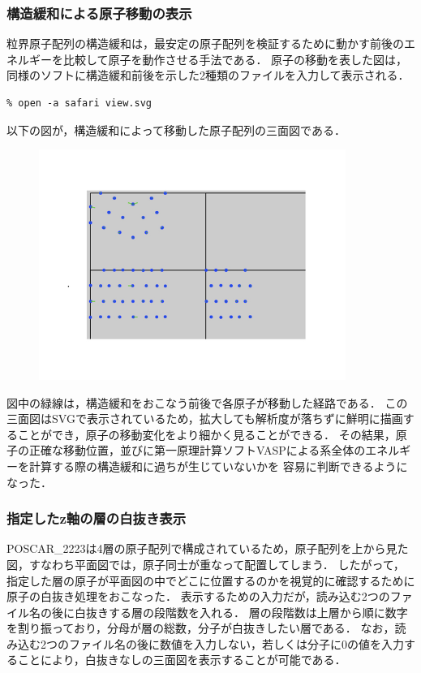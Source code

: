 \subsubsection{構造緩和による原子移動の表示}
粒界原子配列の構造緩和は，最安定の原子配列を検証するために動かす前後のエネルギーを比較して原子を動作させる手法である．
原子の移動を表した図は，同様のソフトに構造緩和前後を示した2種類のファイルを入力して表示される．
\begin{lstlisting}[style=customCsh,basicstyle={\scriptsize\ttfamily}]
% ruby viewer.rb POSCAR_after POSCAR_before
% open -a safari view.svg 
\end{lstlisting}
以下の図が，構造緩和によって移動した原子配列の三面図である．

\begin{figure}[htbp]\begin{center}
\includegraphics[width=10cm,bb= 0 0 737 553]{../figs/./boundary_narita.011.jpeg}
\caption{}
\label{default}\end{center}\end{figure}
図中の緑線は，構造緩和をおこなう前後で各原子が移動した経路である．
この三面図はSVGで表示されているため，拡大しても解析度が落ちずに鮮明に描画することができ，原子の移動変化をより細かく見ることができる．
その結果，原子の正確な移動位置，並びに第一原理計算ソフトVASPによる系全体のエネルギーを計算する際の構造緩和に過ちが生じていないかを
容易に判断できるようになった．

\subsubsection{指定したz軸の層の白抜き表示}
POSCAR\_2223は4層の原子配列で構成されているため，原子配列を上から見た図，すなわち平面図では，原子同士が重なって配置してしまう．
したがって，指定した層の原子が平面図の中でどこに位置するのかを視覚的に確認するために原子の白抜き処理をおこなった．
表示するための入力だが，読み込む2つのファイル名の後に白抜きする層の段階数を入れる．
層の段階数は上層から順に数字を割り振っており，分母が層の総数，分子が白抜きしたい層である．
なお，読み込む2つのファイル名の後に数値を入力しない，若しくは分子に0の値を入力することにより，白抜きなしの三面図を表示することが可能である．

